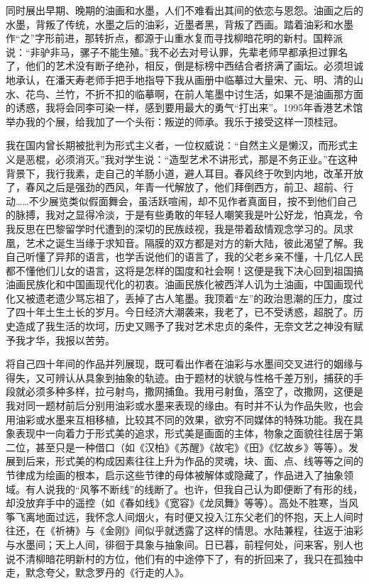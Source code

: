 \documentclass{article}
\begin{document}
同时展出早期、晚期的油画和水墨，人们不难看出其间的依恋与恩怨。油画之后的水墨，背叛了传统，水墨之后的油彩，近墨者黑，背叛了西画。踏着油彩和水墨作“之”字形前进，那转折点，都源于山重水复而寻找柳暗花明的新村。国粹派说：“非驴非马，骡子不能生殖。”我不必去对号认罪，先辈老师早都承担过罪名了，他们的艺术没有断子绝孙，相反，倒是标榜中西结合者挤满了画坛。必须坦诚地承认，在潘天寿老师手把手地指导下我从画册中临摹过大量宋、元、明、清的山水、花鸟、兰竹，不折不扣的临摹啊，在前人笔墨中讨生活，如果不是油画那方面的诱惑，我将会同李可染一样，感到要用最大的勇气“打出来”。1995年香港艺术馆举办我的个展，给我加了一个头衔：叛逆的师承。我乐于接受这样一顶桂冠。

我在国内曾长期被批判为形式主义者，一位权威说：“自然主义是懒汉，而形式主义是恶棍，必须消灭。”我对学生说：“造型艺术不讲形式，那是不务正业。”在这种背景下，我行我素，走自己的羊肠小道，避人耳目。春风终于吹到内地，改革开放了，春风之后是强劲的西风，年青一代解放了，他们拜倒西方，前卫、超前、行动……不少展览类似假面舞会，虽活跃喧闹，却不见作者真面目，按不到他们自己的脉搏，我对之显得冷淡，于是有些勇敢的年轻人嘲笑我是叶公好龙，怕真龙，令我反思在巴黎留学时代遭到的深切的民族歧视，我是带着敌情观念学习的。凤求凰，艺术之诞生当缘于求知音。隔膜的双方都是对方的新大陆，彼此渴望了解。我自己听懂了异邦的语言，也学舌说他们的语言了，我的父老乡亲不懂，十几亿人民都不懂他们儿女的语言，这将是怎样的国度和社会啊！这便是我下决心回到祖国搞油画民族化和中国画现代化的初衷。油画民族化被西洋人讥为土油画，中国画现代化又被遗老遗少骂忘祖了，丢掉了古人笔墨。我顶着“左”的政治思潮的压力，度过了四十年土生土长的岁月。今日经济大潮袭来，我老了，已不受诱惑，超脱了。历史造成了我生活的坎坷，历史又赐予了我对艺术忠贞的条件，无奈文艺之神没有赋予我才华，我报以苦劳。

将自己四十年间的作品并列展现，既可看出作者在油彩与水墨间交叉进行的姻缘与得失，又可辨认从具象到抽象的轨迹。由于题材的状貌与性格千差万别，捕获的手段就必须多种多样，拉弓射鸟，撒网捕鱼。我用弓射鱼，落空了，改撒网，这便是我对同一题材前后分别用油彩或水墨来表现的缘由。有时并不认为作品失败，也会用油彩或水墨来互相移植，比较其不同的效果，欲穷不同媒体的特殊功能。我在具象表现中一向着力于形式美的追求，形式美是画面的主体，物象之面貌往往居于第二位，甚至只是一种借口（如《汉柏》《苏醒》《故宅》《田》《忆故乡》等等）。发展到后来，形式美的构成因素往往上升为作品的灵魂，块、面、点、线等等之间的节律成为绘画的根本，启示这些节律的母体被解体或隐藏了，作品进入了抽象领域。有人说我的“风筝不断线”的线断了。也许，但我自己认为即便断了有形的线，却没放弃手中的遥控（如《春如线》《宽容》《龙凤舞》等等）。高处不胜寒，当风筝飞离地面过远，我怀念人间烟火，有时便又投入江东父老们的怀抱，天上人间时往还，在《祈祷》与《金刚》间似乎就透露了这样的情思。水陆兼程，往返于油彩与水墨间；天上人间，徘徊于具象与抽象间。日已暮，前程何处，问来客，别人也说不清柳暗花明新村的方位，他们有的中途停下了，有的折回来了，我只在孤独中走，默念夸父，默念罗丹的《行走的人》。
\end{document}
